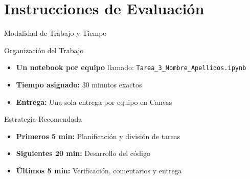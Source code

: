 \documentclass[10pt]{beamer}
\begin{document}
\section{Instrucciones de Evaluación}

\begin{frame}{Modalidad de Trabajo y Tiempo}
  \begin{block}{Organización del Trabajo}
    \begin{itemize}
      \item \textbf{Un notebook por equipo} llamado: \texttt{Tarea\_3\_Nombre\_Apellidos.ipynb}
      \item \textbf{Tiempo asignado:} 30 minutos exactos
      \item \textbf{Entrega:} Una sola entrega por equipo en Canvas
    \end{itemize}
  \end{block}
  
  \begin{alertblock}{Estrategia Recomendada}
    \begin{itemize}
      \item \textbf{Primeros 5 min:} Planificación y división de tareas
      \item \textbf{Siguientes 20 min:} Desarrollo del código
      \item \textbf{Últimos 5 min:} Verificación, comentarios y entrega
    \end{itemize}
  \end{alertblock}
\end{frame}
\end{document}
